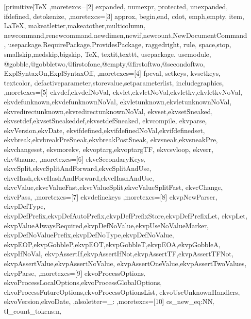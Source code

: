 \def\mylstwd{.55em}
[primitive]{TeX}
  {
    ,moretexcs=[2]%
      {
        expanded,
        numexpr,
        protected,
        unexpanded,
        ifdefined,
        detokenize,
      }
    ,moretexcs=[3]%
      {
        approx,
        begin,end,
        cdot,
        emph,empty,
        item,
        LaTeX,
        makeatletter,makeatother,multicolumn,
        newcommand,renewcommand,newdimen,newif,newcount,NewDocumentCommand,
        usepackage,RequirePackage,ProvidesPackage,
        raggedright,
        rule,
        space,stop,
        smallskip,medskip,bigskip,
        TeX,
        textit,texttt,
        usepackage,
        usemodule,
        @gobble,@gobbletwo,@firstofone,@empty,@firstoftwo,@secondoftwo,
        ExplSyntaxOn,ExplSyntaxOff,
      }
    ,moretexcs=[4]%
      {
        fpeval,
        setkeys,
        kvsetkeys,
        textcolor,
        defactiveparameter,storevalue,setparameterlist,
        includegraphics,
      }
    ,moretexcs=[5]%
      {
        ekvdef,ekvdefNoVal,%
        ekvlet,ekvletNoVal,ekvletkv,ekvletkvNoVal,%
        ekvdefunknown,ekvdefunknownNoVal,%
        ekvletunknown,ekvletunknownNoVal,%
        ekvredirectunknown,ekvredirectunknownNoVal,%
        ekvset,ekvsetSneaked,%
        ekvsetdef,ekvsetSneakeddef,ekvsetdefSneaked,%
        ekvcompile,%
        ekvparse,%
        ekvVersion,ekvDate,%
        ekvifdefined,ekvifdefinedNoVal,ekvifdefinedset,%
        ekvbreak,ekvbreakPreSneak,ekvbreakPostSneak,%
        ekvsneak,ekvsneakPre,%
        ekvchangeset,%
        ekvmorekv,%
        ekvoptarg,ekvoptargTF,%
        ekvcsvloop,%
        ekverr,%
        ekv@name,%
      }
    ,moretexcs=[6]%
      {
        ekvcSecondaryKeys,%
        ekvcSplit,ekvcSplitAndForward,ekvcSplitAndUse,%
        ekvcHash,ekvcHashAndForward,ekvcHashAndUse,%
        ekvcValue,ekvcValueFast,ekvcValueSplit,ekvcValueSplitFast,%
        ekvcChange,%
        ekvcPass,%
      }
    ,moretexcs=[7]%
      {
        ekvdefinekeys
      }
    ,moretexcs=[8]%
      {
        ekvpNewParser,
        ekvpDefType,
        ekvpDefPrefix,ekvpDefAutoPrefix,ekvpDefPrefixStore,ekvpDefPrefixLet,
        ekvpLet,
        ekvpValueAlwaysRequired,ekvpDefNoValue,ekvpUseNoValueMarker,
        ekvpDefNoValuePrefix,ekvpDefNoType,ekvpDefNoValue,
        ekvpEOP,ekvpGobbleP,ekvpEOT,ekvpGobbleT,ekvpEOA,ekvpGobbleA,
        ekvpIfNoVal,
        ekvpAssertIf,ekvpAssertIfNot,ekvpAssertTF,ekvpAssertTFNot,
        ekvpAssertValue,ekvpAssertNoValue,
        ekvpAssertOneValue,ekvpAssertTwoValues,
        ekvpParse,
      }
    ,moretexcs=[9]%
      {
        ekvoProcessOptions,%
        ekvoProcessLocalOptions,ekvoProcessGlobalOptions,%
        ekvoProcessFutureOptions,ekvoProcessOptionsList,%
        ekvoUseUnknownHandlers,%
        ekvoVersion,ekvoDate,%
      }
    ,alsoletter={_:}
    ,moretexcs=[10]%
      {
        cs_new_eq:NN,
        tl_count_tokens:n,
      }
  }
